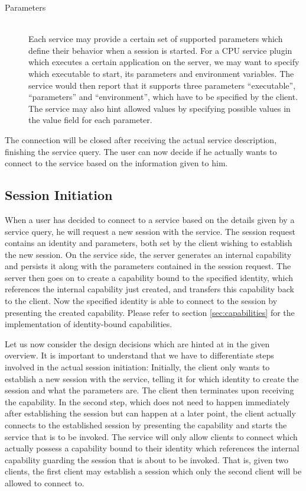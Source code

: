 \begin{description}
    \item[Parameters]\hfill\\
        Each service may provide a certain set of supported parameters which define their behavior when a session is started.
        For a CPU service plugin which executes a certain application on the server, we may want to specify which executable to start, its parameters and environment variables.
        The service would then report that it supports three parameters ``executable'', ``parameters'' and ``environment'', which have to be specified by the client.
        The service may also hint allowed values by specifying possible values in the value field for each parameter.
\end{description}

The connection will be closed after receiving the actual service description, finishing the service query.
The user can now decide if he actually wants to connect to the service based on the information given to him.

\subsection{Session Initiation}
\label{sec:session-initiation}

When a user has decided to connect to a service based on the details given by a service query, he will request a new session with the service.
The session request contains an identity and parameters, both set by the client wishing to establish the new session.
On the service side, the server generates an internal capability and persists it along with the parameters contained in the session request.
The server then goes on to create a capability bound to the specified identity, which references the internal capability just created, and transfers this capability back to the client.
Now the specified identity is able to connect to the session by presenting the created capability.
Please refer to section \ref{sec:capabilities} for the implementation of identity-bound capabilities.

Let us now consider the design decisions which are hinted at in the given overview.
It is important to understand that we have to differentiate steps involved in the actual session initiation:
Initially, the client only wants to establish a new session with the service, telling it for which identity to create the session and what the parameters are.
The client then terminates upon receiving the capability.
In the second step, which does not need to happen immediately after establishing the session but can happen at a later point, the client actually connects to the established session by presenting the capability and starts the service that is to be invoked.
The service will only allow clients to connect which actually possess a capability bound to their identity which references the internal capability guarding the session that is about to be invoked.
That is, given two clients, the first client may establish a session which only the second client will be allowed to connect to.

